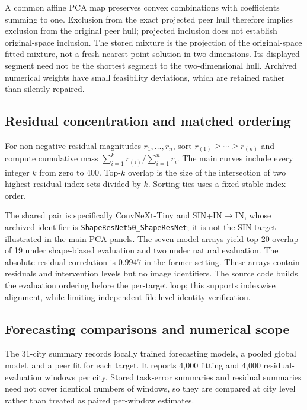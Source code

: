A common affine PCA map preserves convex combinations with coefficients summing to one. Exclusion from the exact projected peer hull therefore implies exclusion from the original peer hull; projected inclusion does not establish original-space inclusion. The stored mixture is the projection of the original-space fitted mixture, not a fresh nearest-point solution in two dimensions. Its displayed segment need not be the shortest segment to the two-dimensional hull. Archived numerical weights have small feasibility deviations, which are retained rather than silently repaired.




\subsection{Residual concentration and matched ordering}
For non-negative residual magnitudes $r_1,\ldots,r_n$, sort $r_{(1)}\geq\cdots\geq r_{(n)}$ and compute cumulative mass $\sum_{i=1}^k r_{(i)}/\sum_{i=1}^nr_i$. The main curves include every integer $k$ from zero to 400. Top-$k$ overlap is the size of the intersection of two highest-residual index sets divided by $k$. Sorting ties uses a fixed stable index order.

The shared pair is specifically ConvNeXt-Tiny and SIN+IN$\to$IN, whose archived identifier is \texttt{ShapeResNet50\_ShapeResNet}; it is not the SIN target illustrated in the main PCA panels. The seven-model arrays yield top-20 overlap of 19 under shape-biased evaluation and two under natural evaluation. The absolute-residual correlation is $0.9947$ in the former setting. These arrays contain residuals and intervention levels but no image identifiers. The source code builds the evaluation ordering before the per-target loop; this supports indexwise alignment, while limiting independent file-level identity verification.

\subsection{Forecasting comparisons and numerical scope}
\label{app:traffic-caveats}
The 31-city summary records locally trained forecasting models, a pooled global model, and a peer fit for each target. It reports 4,000 fitting and 4,000 residual-evaluation windows per city. Stored task-error summaries and residual summaries need not cover identical numbers of windows, so they are compared at city level rather than treated as paired per-window estimates.

